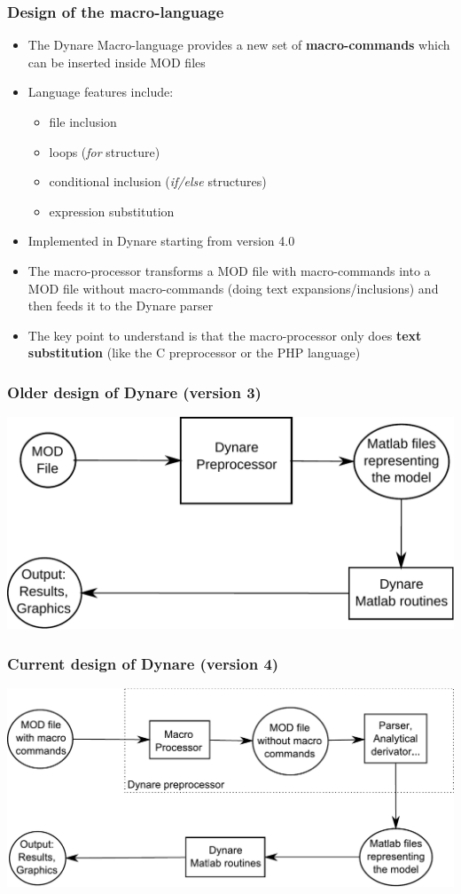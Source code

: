\documentclass{beamer}
\begin{document}
\begin{frame}
  \frametitle{Design of the macro-language}
  \begin{itemize}
  \item The Dynare Macro-language provides a new set of \textbf{macro-commands} which can be inserted inside MOD files
  \item Language features include:
    \begin{itemize}
    \item file inclusion
    \item loops (\textit{for} structure)
    \item conditional inclusion (\textit{if/else} structures)
    \item expression substitution
    \end{itemize}
  \item Implemented in Dynare starting from version 4.0
  \item The macro-processor transforms a MOD file with macro-commands into a MOD file without macro-commands (doing text expansions/inclusions) and then feeds it to the Dynare parser
  \item The key point to understand is that the macro-processor only does \textbf{text substitution} (like the C preprocessor or the PHP language)
  \end{itemize}
\end{frame}

\begin{frame}
  \frametitle{Older design of Dynare (version 3)}
  \includegraphics[width=0.95\linewidth]{old-design.pdf}
\end{frame}

\begin{frame}
  \frametitle{Current design of Dynare (version 4)}
  \includegraphics[width=0.95\linewidth]{new-design.pdf}
\end{frame}
\end{document}
